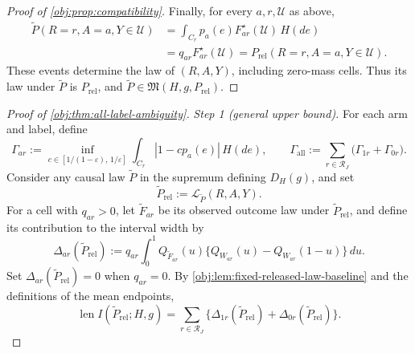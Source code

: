 \documentclass[11pt]{article}
\begin{document}
\begin{proof}[Proof of \cref{obj:prop:compatibility}]
Finally, for every \(a,r,\mathcal U\) as above,
\[
\begin{aligned}
\widetilde P(R=r,A=a,Y\in\mathcal U)
&=\int_{C_r}p_a(e)F^\star_{ar}(\mathcal U)\,H(de)\\
&=q_{ar}F^\star_{ar}(\mathcal U)
=P_{\mathrm{rel}}(R=r,A=a,Y\in\mathcal U).
\end{aligned}
\]
These events determine the law of \((R,A,Y)\), including zero-mass cells. Thus its law under \(\widetilde P\) is \(P_{\mathrm{rel}}\), and \(\widetilde P\in\mathfrak M(H,g,P_{\mathrm{rel}})\).
\end{proof}

\begin{proof}[Proof of \cref{obj:thm:all-label-ambiguity}]
\textit{Step 1 (general upper bound).}
For each arm and label, define
\[
\Gamma_{ar}
:=\inf_{c\in[1/(1-\varepsilon),\,1/\varepsilon]}
       \int_{C_r}|1-cp_a(e)|\,H(de),
\qquad
\Gamma_{\mathrm{all}}:=\sum_{r\in\mathcal R_J}
       \bigl(\Gamma_{1r}+\Gamma_{0r}\bigr).
\]
Consider any causal law \(\widetilde P\) in the supremum defining \(D_H(g)\), and set
\[
\widetilde P_{\mathrm{rel}}
:=\mathcal L_{\widetilde P}(R,A,Y).
\]
For a cell with \(q_{ar}>0\), let \(\widetilde F_{ar}\) be its observed outcome law under \(\widetilde P_{\mathrm{rel}}\), and define its contribution to the interval width by
\[
\Delta_{ar}(\widetilde P_{\mathrm{rel}})
:=q_{ar}\int_0^1 Q_{\widetilde F_{ar}}(u)
       \bigl\{Q_{W_{ar}}(u)-Q_{W_{ar}}(1-u)\bigr\}\,du.
\]
Set \(\Delta_{ar}(\widetilde P_{\mathrm{rel}})=0\) when \(q_{ar}=0\). By \cref{obj:lem:fixed-released-law-baseline} and the definitions of the mean endpoints,
\[
\operatorname{len}I(\widetilde P_{\mathrm{rel}};H,g)
=\sum_{r\in\mathcal R_J}
 \bigl\{\Delta_{1r}(\widetilde P_{\mathrm{rel}})
       +\Delta_{0r}(\widetilde P_{\mathrm{rel}})\bigr\}.
\]


\end{proof}
\end{document}

